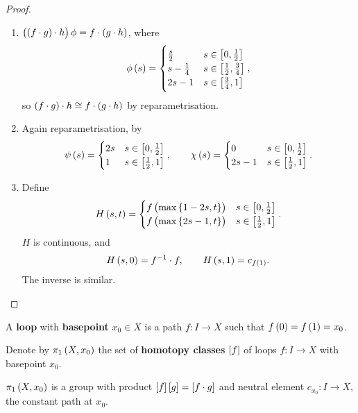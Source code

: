 \begin{proof}
\hfill
\begin{enumerate}
\item $ \br{\br{f \cdot g} \cdot h}\phi = f \cdot \br{g \cdot h} $, where
$$ \phi\br{s} =
\begin{cases}
\tfrac{s}{2} & s \in \sbr{0, \tfrac{1}{2}} \\
s - \tfrac{1}{4} & s \in \sbr{\tfrac{1}{2}, \tfrac{3}{4}} \\
2s - 1 & s \in \sbr{\tfrac{3}{4}, 1}
\end{cases},
$$
so $ \br{f \cdot g} \cdot h \cong f \cdot \br{g \cdot h} $ by reparametrisation.
\item Again reparametrisation, by
$$ \psi\br{s} =
\begin{cases}
2s & s \in \sbr{0, \tfrac{1}{2}} \\
1 & s \in \sbr{\tfrac{1}{2}, 1}
\end{cases},
\qquad \chi\br{s} =
\begin{cases}
0 & s \in \sbr{0, \tfrac{1}{2}} \\
2s - 1 & s \in \sbr{\tfrac{1}{2}, 1}
\end{cases}.
$$
\item Define
$$ H\br{s, t} =
\begin{cases}
f\br{\max\cbr{1 - 2s, t}} & s \in \sbr{0, \tfrac{1}{2}} \\
f\br{\max\cbr{2s - 1, t}} & s \in \sbr{\tfrac{1}{2}, 1}
\end{cases}.
$$
$ H $ is continuous, and
$$ H\br{s, 0} = f^{-1} \cdot f, \qquad H\br{s, 1} = c_{f\br{1}}. $$
The inverse is similar.
\end{enumerate}
\end{proof}

\pagebreak

\begin{definition*}
A \textbf{loop} with \textbf{basepoint} $ x_0 \in X $ is a path $ f : I \to X $ such that $ f\br{0} = f\br{1} = x_0 $.
\end{definition*}

\begin{definition*}
Denote by $ \pi_1\br{X, x_0} $ the set of \textbf{homotopy classes} $ \sbr{f} $ of loops $ f : I \to X $ with basepoint $ x_0 $.
\end{definition*}

\begin{proposition}
$ \pi_1\br{X, x_0} $ is a group with product $ \sbr{f}\sbr{g} = \sbr{f \cdot g} $ and neutral element $ c_{x_0} : I \to X $, the constant path at $ x_0 $.
\end{proposition}

